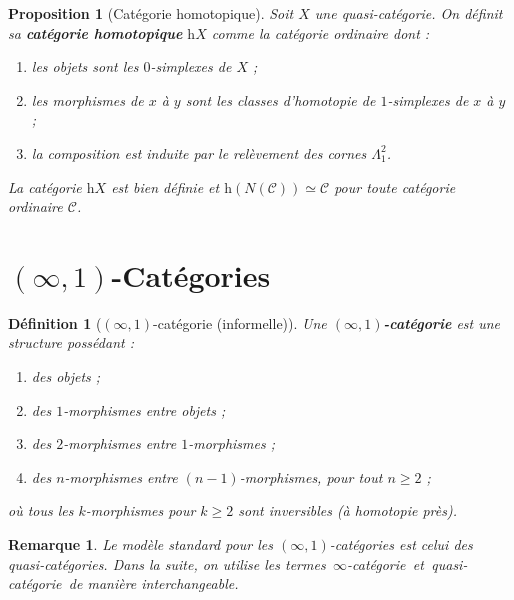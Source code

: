 \documentclass[a4paper,12pt]{book}
\newtheorem{proposition}[theoreme]{Proposition}
\newtheorem{definition}[theoreme]{Définition}
\newtheorem*{remarque}{Remarque}
\providecommand{\og}{\guillemotleft\,}
\providecommand{\fg}{\,\guillemotright}
\begin{document}
\begin{proposition}[Catégorie homotopique]\label{prop:cat-homotopique}
Soit $X$ une quasi-catégorie.  On définit sa \textbf{catégorie
homotopique} $\mathrm{h}X$ comme la catégorie ordinaire dont :
\begin{enumerate}[label=(\roman*)]
\item les objets sont les $0$-simplexes de $X$ ;
\item les morphismes de $x$ à $y$ sont les classes d'homotopie de
      $1$-simplexes de $x$ à $y$ ;
\item la composition est induite par le relèvement des cornes
      $\Lambda^2_1$.
\end{enumerate}
La catégorie $\mathrm{h}X$ est bien définie et
$\mathrm{h}(N(\mathcal{C})) \simeq \mathcal{C}$ pour toute catégorie
ordinaire $\mathcal{C}$.
\end{proposition}


\section{$(\infty,1)$-Catégories}\label{sec:infty-1-categories}


\begin{definition}[$(\infty,1)$-catégorie (informelle)]
\label{def:infty-1-cat}
Une \textbf{$(\infty,1)$-catégorie} est une structure possédant :
\begin{enumerate}[label=(\roman*)]
\item des objets ;
\item des $1$-morphismes entre objets ;
\item des $2$-morphismes entre $1$-morphismes ;
\item des $n$-morphismes entre $(n-1)$-morphismes, pour tout $n \geq 2$ ;
\end{enumerate}
où tous les $k$-morphismes pour $k \geq 2$ sont inversibles
(à homotopie près).
\end{definition}

\begin{remarque}\label{rem:infty-vs-quasi}
Le modèle standard pour les $(\infty,1)$-catégories est celui
des quasi-catégories.  Dans la suite, on utilise les termes
\og $\infty$-catégorie\fg{} et \og quasi-catégorie\fg{} de manière
interchangeable.
\end{remarque}
\end{document}
